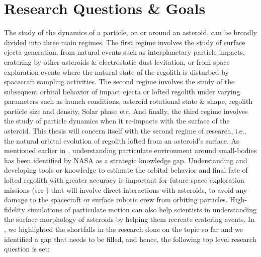 \chapter{Research Questions \& Goals}
\label{chap:research_questions}
\graphicspath{{Research_Questions/Images/}}

The study of the dynamics of a particle, on or around an asteroid, can be broadly divided into three main regimes. The first regime involves the study of surface ejecta generation, from natural events such as interplanetary particle impacts, cratering by other asteroids \& electrostatic dust levitation, or from space exploration events where the natural state of the regolith is disturbed by spacecraft sampling activities. The second regime involves the study of the subsequent orbital behavior of impact ejecta or lofted regolith under varying parameters such as launch conditions, asteroid rotational state \& shape, regolith particle size and density, Solar phase etc. And finally, the third regime involves the study of particle dynamics when it re-impacts with the surface of the asteroid. This thesis will concern itself with the second regime of research, i.e., the natural orbital evolution of regolith lofted from an asteroid’s surface.
%
\newline\newline
%
As mentioned earlier in , understanding particulate environment around small-bodies has been identified by \gls{NASA} as a strategic knowledge gap. Understanding and developing tools or knowledge to estimate the orbital behavior and final fate of lofted regolith with greater accuracy is important for future space exploration missions (see ) that will involve direct interactions with asteroids, to avoid any damage to the spacecraft or surface robotic crew from orbiting particles. High-fidelity simulations of particulate motion can also help scientists in understanding the surface morphology of asteroids by helping them recreate cratering events. In , we highlighted the shortfalls in the research done on the topic so far and we identified a gap that needs to be filled, and hence, the following top level research question is set:
\vspace{5mm}
\begin{center}
\end{center}
